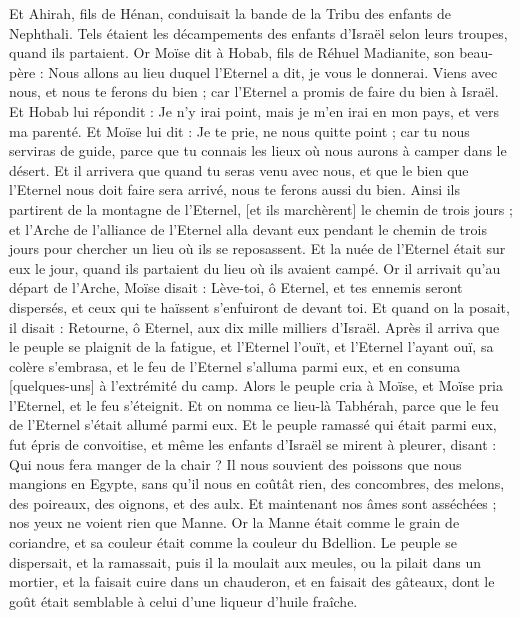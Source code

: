 \begin{multicols}{2}
Et Ahirah, fils de Hénan, conduisait la bande de la Tribu des enfants de Nephthali.
Tels étaient les décampements des enfants d'Israël selon leurs troupes, quand ils partaient.
Or Moïse dit à Hobab, fils de Réhuel Madianite, son beau-père : Nous allons au lieu duquel l'Eternel a dit, je vous le donnerai. Viens avec nous, et nous te ferons du bien ; car l'Eternel a promis de faire du bien à Israël.
Et Hobab lui répondit : Je n'y irai point, mais je m'en irai en mon pays, et vers ma parenté.
Et Moïse lui dit : Je te prie, ne nous quitte point ; car tu nous serviras de guide, parce que tu connais les lieux où nous aurons à camper dans le désert.
Et il arrivera que quand tu seras venu avec nous, et que le bien que l'Eternel nous doit faire sera arrivé, nous te ferons aussi du bien.
Ainsi ils partirent de la montagne de l'Eternel, [et ils marchèrent] le chemin de trois jours ; et l'Arche de l'alliance de l'Eternel alla devant eux pendant le chemin de trois jours pour chercher un lieu où ils se reposassent.
Et la nuée de l'Eternel était sur eux le jour, quand ils partaient du lieu où ils avaient campé.
Or il arrivait qu'au départ de l'Arche, Moïse disait : Lève-toi, ô Eternel, et tes ennemis seront dispersés, et ceux qui te haïssent s'enfuiront de devant toi.
Et quand on la posait, il disait : Retourne, ô Eternel, aux dix mille milliers d'Israël.
\VerseOne{}Après il arriva que le peuple se plaignit de la fatigue, et l'Eternel l'ouït, et l'Eternel l'ayant ouï, sa colère s'embrasa, et le feu de l'Eternel s'alluma parmi eux, et en consuma [quelques-uns] à l'extrémité du camp.
Alors le peuple cria à Moïse, et Moïse pria l'Eternel, et le feu s'éteignit.
Et on nomma ce lieu-là Tabhérah, parce que le feu de l'Eternel s'était allumé parmi eux.
Et le peuple ramassé qui était parmi eux, fut épris de convoitise, et même les enfants d'Israël se mirent à pleurer, disant : Qui nous fera manger de la chair ?
Il nous souvient des poissons que nous mangions en Egypte, sans qu'il nous en coûtât rien, des concombres, des melons, des poireaux, des oignons, et des aulx.
Et maintenant nos âmes sont asséchées ; nos yeux ne voient rien que Manne.
Or la Manne était comme le grain de coriandre, et sa couleur était comme la couleur du Bdellion.
Le peuple se dispersait, et la ramassait, puis il la moulait aux meules, ou la pilait dans un mortier, et la faisait cuire dans un chauderon, et en faisait des gâteaux, dont le goût était semblable à celui d'une liqueur d'huile fraîche.

\end{multicols}
